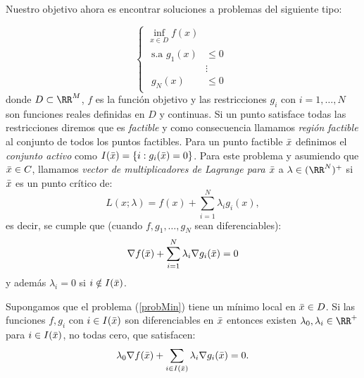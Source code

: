 	Nuestro objetivo ahora es encontrar soluciones a problemas del siguiente tipo:
	
		\begin{equation}\label{probMin}
		\begin{cases}
		\inf_{x\in D} f(x)\\
		\begin{split}
		\text{s.a } g_1(x) &\leq 0 \\
		&\vdots \\
		g_N(x) &\leq 0
		\end{split}
		
		\end{cases} 
		\end{equation}
		donde $ D \subset \RR^M$, $ f  $ es la función objetivo y las restricciones $ g_i $ con $ i =1,\dots, N $ son funciones reales definidas en $ D $ y continuas. Si un punto satisface todas las restricciones diremos que es \textit{factible}  y como consecuencia llamamos \textit{región factible} al conjunto de todos los puntos factibles. Para un punto factible $ \bar{x} $ definimos el \textit{conjunto activo} como $ I(\bar{x}) = \{i: g_i(\bar{x}) = 0\}$. Para este problema y asumiendo que $ \bar{x} \in C $, llamamos \textit{vector de multiplicadores de Lagrange para $ \bar{x} $} a $ \lambda \in (\RR^N)^+ $ si $ \bar{x} $ es un punto crítico de:
		\[
		L(x;\lambda) = f(x) + \sum_{i=1}^{N} \lambda_i g_i(x),
		\]
		es decir, se cumple que (cuando $ f,g_1,\dots,g_N $ sean diferenciables):
		\[
		\nabla f(\bar{x}) + \sum_{i=1}^{N} \lambda_i \nabla g_i(\bar{x}) = 0
		\]
		y además $ \lambda_i = 0 $ si $ i \notin I(\bar{x}) $.
		\begin{teoremaBox}\label{FritzJohn}
			Supongamos que el problema (\ref{probMin}) tiene un mínimo local en $ \bar{x} \in D $. Si las funciones $ f, g_i $ con $ i \in I(\bar{x}) $ son diferenciables en $ \bar{x} $ entonces existen $ \lambda_0, \lambda_i \in \RR^+ $ para $ i \in I(\bar{x}) $, no todas cero, que satisfacen:
			\[
			\lambda_0 \nabla f(\bar{x}) + \sum_{i \in I(\bar{x})} \lambda_i \nabla g_i(\bar{x}) = 0.
			\]
		\end{teoremaBox}
